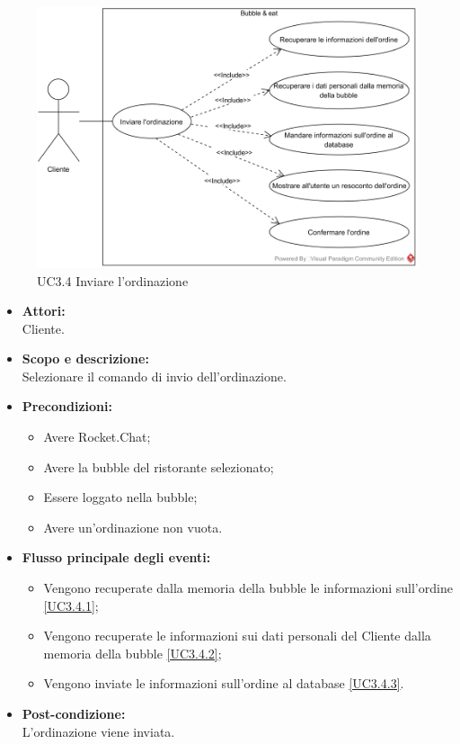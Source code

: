 
\begin{figure}[H]
	\centering
	\includegraphics[width=15cm]{../../documenti/AnalisiDeiRequisiti/Diagrammi_img/uc3_4.png}
	\caption{UC3.4 Inviare l'ordinazione}
\end{figure}

\begin{itemize}
	\item \textbf{Attori:}
	\\Cliente.
	\item \textbf{Scopo e descrizione:} 
	\\Selezionare il comando di invio dell'ordinazione.
	\item \textbf{Precondizioni:}
	\begin{itemize}
		\item Avere Rocket.Chat;
		\item Avere la bubble del ristorante selezionato;
		\item Essere loggato nella bubble;
		\item Avere un'ordinazione non vuota.
	\end{itemize}
	\item \textbf{Flusso principale degli eventi:}
	\begin{itemize}
		\item Vengono recuperate dalla memoria della bubble le informazioni sull'ordine \ref{UC3.4.1};
		\item Vengono recuperate le informazioni sui dati personali del Cliente dalla memoria della bubble \ref{UC3.4.2};
		\item Vengono inviate le informazioni sull'ordine al database \ref{UC3.4.3}.
	\end{itemize}
	\item \textbf{Post-condizione:}
	\\L'ordinazione viene inviata.
\end{itemize}

